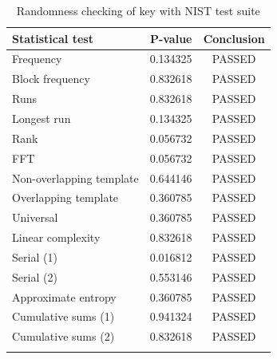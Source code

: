 \begin{table}[H]
	\caption{Randomness checking of key with NIST test suite}
	\small
	\label{table:nist}
	\begin{center}
		\begin{tabular}{|l |c| c| |}
			\hline
			Statistical test         & P-value  & Conclusion \\ [0.5ex]
			\hline
			Frequency                & 0.134325 & PASSED     \\
			Block frequency          & 0.832618 & PASSED     \\
			Runs                     & 0.832618 & PASSED     \\
			Longest run              & 0.134325 & PASSED     \\
			Rank                     & 0.056732 & PASSED     \\
			FFT                      & 0.056732 & PASSED     \\
			Non-overlapping template & 0.644146 & PASSED     \\
			Overlapping template     & 0.360785 & PASSED     \\
			Universal                & 0.360785 & PASSED     \\
			Linear complexity        & 0.832618 & PASSED     \\
			Serial (1)               & 0.016812 & PASSED     \\
			Serial (2)               & 0.553146 & PASSED     \\
			Approximate entropy      & 0.360785 & PASSED     \\
			Cumulative sums (1)      & 0.941324 & PASSED     \\
			Cumulative sums (2)      & 0.832618 & PASSED     \\
			\hline
			\multicolumn{1}{l}{}
		\end{tabular}%
	\end{center}

\end{table}

